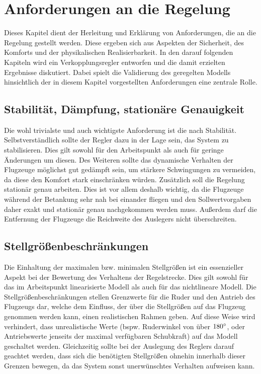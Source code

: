 \chapter{Anforderungen an die Regelung}\label{cha:Anforderungen}
Dieses Kapitel dient der Herleitung und Erklärung von Anforderungen, die an die Regelung gestellt werden. Diese ergeben sich aus Aspekten der 
Sicherheit, des Komforts und der physikalischen Realisierbarkeit. In den darauf folgenden Kapiteln wird ein Verkopplungsregler entworfen und die damit erzielten Ergebnisse diskutiert. Dabei spielt die Validierung des geregelten Modells hinsichtlich der in diesem Kapitel vorgestellten Anforderungen eine zentrale Rolle.

\section{Stabilität, Dämpfung, stationäre Genauigkeit}
Die wohl trivialste und auch wichtigste Anforderung ist die nach Stabilität. Selbstverständlich sollte der Regler dazu in der Lage sein, das System zu stabilisieren. Dies gilt sowohl für den Arbeitspunkt als auch für geringe Änderungen um diesen. Des Weiteren sollte das dynamische Verhalten der Flugzeuge möglichst gut gedämpft sein, um stärkere Schwingungen zu vermeiden, da diese den Komfort stark einschränken würden. Zusätzlich soll die Regelung stationär genau arbeiten. Dies ist vor allem deshalb wichtig, da die Flugzeuge während der Betankung sehr nah bei einander fliegen und den Sollwertvorgaben daher exakt und stationär genau nachgekommen werden muss. Außerdem darf die Entfernung der Flugzeuge die Reichweite des Auslegers nicht überschreiten.

\section{Stellgrößenbeschränkungen}
Die Einhaltung der maximalen bzw. minimalen Stellgrößen ist ein essenzieller Aspekt bei der Bewertung des Verhaltens der Regelstrecke. Dies gilt sowohl für das im Arbeitspunkt linearisierte Modell als auch für das nichtlineare Modell. Die Stellgrößenbeschränkungen stellen Grenzwerte für die Ruder und den Antrieb des Flugzeugs dar, welche dem Einfluss, der über die Stellgrößen auf das Flugzeug genommen werden kann, einen realistischen Rahmen geben. Auf diese Weise wird verhindert, dass unrealistische Werte (bspw. Ruderwinkel von über $180\degree$, oder Antriebswerte jenseits der maximal verfügbaren Schubkraft) auf das Modell geschaltet werden. Gleichzeitig sollte bei der Auslegung des Reglers darauf geachtet werden, dass sich die benötigten Stellgrößen ohnehin innerhalb dieser Grenzen bewegen, da das System sonst unerwünschtes Verhalten aufweisen kann. 

